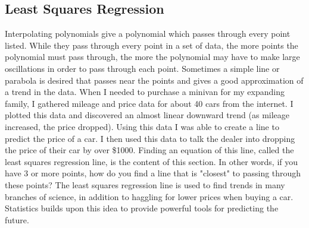\subsection{Least Squares Regression}
Interpolating polynomials give a polynomial which passes through every point listed. While they pass through every point in a set of data, the more points the polynomial must pass through, the more the polynomial may have to make large oscillations in order to pass through each point.  Sometimes a simple line or parabola is desired that passes near the points and gives a good approximation of a trend in the data. When I needed to purchase a minivan for my expanding family, I gathered mileage and price data for about 40 cars from the internet. I plotted this data and discovered an almost linear downward trend (as mileage increased, the price dropped).  Using this data I was able to create a line to predict the price of a car.  I then used this data to talk the dealer into dropping the price of their car by over \$1000.  Finding an equation of this line, called the least squares regression line, is the content of this section. In other words, if you have 3 or more points, how do you find a line that is "closest" to passing through these points?  The least squares regression line is used to find trends in many branches of science, in addition to haggling for lower prices when buying a car. Statistics builds upon this idea to provide powerful tools for predicting the future.

